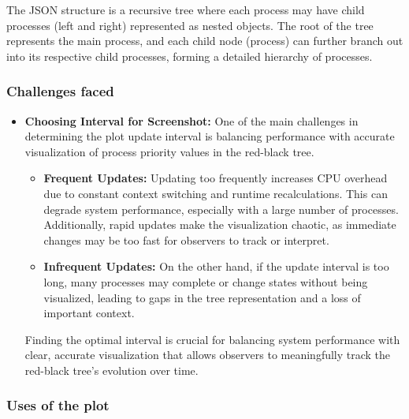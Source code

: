 \documentclass[12pt]{article}
\begin{document}
The JSON structure is a recursive tree where each process may have child processes (left and right) represented as nested objects. The root of the tree represents the main process, and each child node (process) can further branch out into its respective child processes, forming a detailed hierarchy of processes.

\subsubsection{Challenges faced}
  \begin{itemize}
      \item \textbf{Choosing Interval for Screenshot:} One of the main challenges in determining the plot update interval is balancing performance with accurate visualization of process priority values in the red-black tree.
    \begin{itemize}
    \item \textbf{Frequent Updates:} Updating too frequently increases CPU overhead due to constant context switching and runtime recalculations. This can degrade system performance, especially with a large number of processes. Additionally, rapid updates make the visualization chaotic, as immediate changes may be too fast for observers to track or interpret.
    
    \item \textbf{Infrequent Updates:} On the other hand, if the update interval is too long, many processes may complete or change states without being visualized, leading to gaps in the tree representation and a loss of important context.
    \end{itemize}
    Finding the optimal interval is crucial for balancing system performance with clear, accurate visualization that allows observers to meaningfully track the red-black tree’s evolution over time.
  \end{itemize}
\subsubsection{Uses of the plot}
\end{document}
